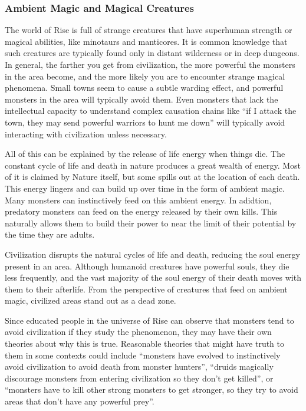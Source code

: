     \subsubsection{Ambient Magic and Magical Creatures}
      The world of Rise is full of strange creatures that have superhuman strength or magical abilities, like minotaurs and manticores.
      It is common knowledge that such creatures are typically found only in distant wilderness or in deep dungeons.
      In general, the farther you get from civilization, the more powerful the monsters in the area become, and the more likely you are to encounter strange magical phenomena.
      Small towns seem to cause a subtle warding effect, and powerful monsters in the area will typically avoid them.
      Even monsters that lack the intellectual capacity to understand complex causation chains like ``if I attack the town, they may send powerful warriors to hunt me down'' will typically avoid interacting with civilization unless necessary.

      All of this can be explained by the release of life energy when things die.
      The constant cycle of life and death in nature produces a great wealth of energy.
      Most of it is claimed by Nature itself, but some spills out at the location of each death.
      This energy lingers and can build up over time in the form of ambient magic.
      Many monsters can instinctively feed on this ambient energy.
      In adidtion, predatory monsters can feed on the energy released by their own kills.
      This naturally allows them to build their power to near the limit of their potential by the time they are adults.

      Civilization disrupts the natural cycles of life and death, reducing the soul energy present in an area.
      Although humanoid creatures have powerful souls, they die less frequently, and the vast majority of the soul energy of their death moves with them to their afterlife.
      From the perspective of creatures that feed on ambient magic, civilized areas stand out as a dead zone.

      Since educated people in the universe of Rise can observe that monsters tend to avoid civilization if they study the phenomenon, they may have their own theories about why this is true.
      Reasonable theories that might have truth to them in some contexts could include ``monsters have evolved to instinctively avoid civilization to avoid death from monster hunters'', ``druids magically discourage monsters from entering civilization so they don't get killed'', or ``monsters have to kill other strong monsters to get stronger, so they try to avoid areas that don't have any powerful prey''.

